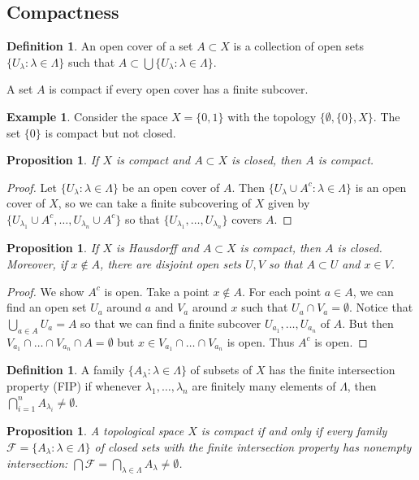 \documentclass[11pt]{amsart}
\newtheorem{proposition}[theorem]{Proposition}
\theoremstyle{definition}
\newtheorem{definition}[theorem]{Definition}
\newtheorem{example}[theorem]{Example}
\numberwithin{equation}{section}
\begin{document}
\subsection{Compactness}
\begin{definition}
    An open cover of a set $A\subset X$ is a collection of open sets $\{U_\lambda:\lambda\in \Lambda\}$ such that $A\subset\bigcup\{U_\lambda:\lambda\in \Lambda\}$.

    A set $A$ is compact if every open cover has a finite subcover.
\end{definition}
\begin{example}
    Consider the space $X=\{0,1\}$ with the topology $\{\emptyset, \{0\}, X\}$. The set $\{0\}$ is compact but not closed.
\end{example}
\begin{proposition}\label{compactclosed}
    If $X$ is compact and $A\subset X$ is closed, then $A$ is compact.
\end{proposition}
\begin{proof}
    Let $\{U_\lambda:\lambda\in \Lambda\}$ be an open cover of $A$. Then $\{U_\lambda\cup A^c:\lambda\in \Lambda\}$ is an open cover of $X$, so we can take a finite subcovering of $X$ given by $\{U_{\lambda_1}\cup A^c,\ldots,U_{\lambda_n}\cup A^c\}$ so that $\{U_{\lambda_1},\ldots,U_{\lambda_n}\}$ covers $A$.
\end{proof}
\begin{proposition}
    If $X$ is Hausdorff and $A\subset X$ is compact, then $A$ is closed. Moreover, if $x\not\in A$, there are disjoint open sets $U,V$ so that $A\subset U$ and $x\in V$.
\end{proposition}
\begin{proof}
    We show $A^c$ is open. Take a point $x\not\in A$. For each point $a\in A$, we can find an open set $U_a$ around $a$ and $V_a$ around $x$ such that $U_a\cap V_a=\emptyset$. Notice that $\bigcup_{a\in A}U_a=A$ so that we can find a finite subcover $U_{a_1},\ldots,U_{a_n}$ of $A$. But then $V_{a_1}\cap \ldots\cap V_{a_n}\cap A=\emptyset$ but $x\in V_{a_1}\cap\ldots\cap V_{a_n}$ is open. Thus $A^c$ is open.
\end{proof}
\begin{definition}
    A family $\{A_\lambda:\lambda\in \Lambda\}$ of subsets of $X$ has the finite intersection property (FIP) if whenever $\lambda_1,\ldots,\lambda_n$ are finitely many elements of $\Lambda$, then $\bigcap_{i=1}^n A_{\lambda_i}\ne\emptyset$.
\end{definition}
\begin{proposition}
    A topological space $X$ is compact if and only if every family $\mathcal F=\{A_\lambda:\lambda\in\Lambda\}$ of closed sets with the finite intersection property has nonempty intersection: $\bigcap\mathcal F=\bigcap_{\lambda\in \Lambda}A_\lambda\ne\emptyset$.
\end{proposition}
\end{document}
